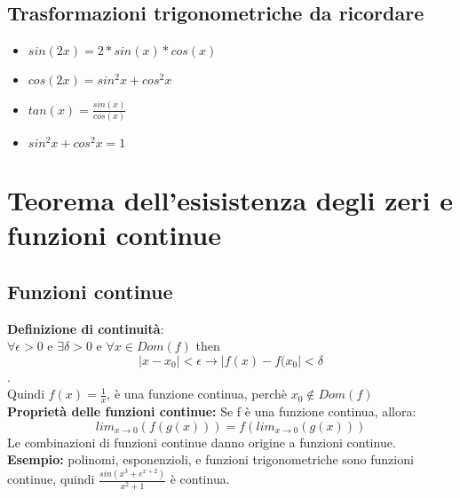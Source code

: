 \documentclass[11pt]{article}
\begin{document}
\subsection{Trasformazioni trigonometriche da ricordare}
\begin{itemize}
    \item $sin(2x) = 2*sin(x)*cos(x)$
    \item $cos(2x) = sin^{2}x + cos^{2}x$
    \item $tan(x) = \frac{sin(x)}{cos(x)}$
    \item $sin^{2}x + cos^{2}x = 1$
\end{itemize}
\section{Teorema dell'esisistenza degli zeri e funzioni continue}
\subsection{Funzioni continue}
\textbf{Definizione di continuità}:\\
$\forall \epsilon > 0$ e $\exists \delta > 0$ e $\forall x \in Dom(f)$
then $$|x - x_{0}| < \epsilon \rightarrow |f(x) - f(x_{0}| < \delta$$.\\
Quindi $f(x) = \frac{1}{x}$, è una funzione continua, perchè $x_{0} \notin Dom(f)$\\
\textbf{Proprietà delle funzioni continue:} Se f è una funzione continua, allora: $$lim_{x \rightarrow 0}(f(g(x))) = f(lim_{x \rightarrow 0}(g(x)))$$
Le combinazioni di funzioni continue danno origine a funzioni continue. \\\textbf{Esempio:} polinomi, esponenzioli, e funzioni trigonometriche 
sono funzioni continue, quindi $\frac{sin(x^{3} + e^{x+2})}{x^{2}+1}$ è  continua.\\
\end{document}
